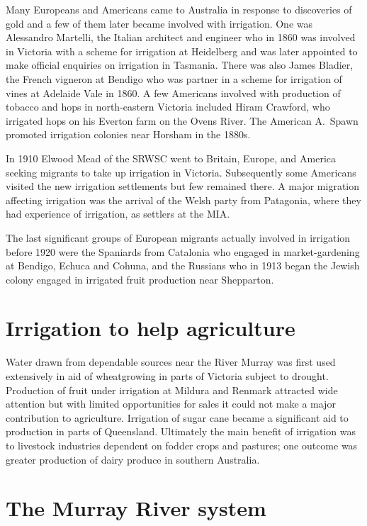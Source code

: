 Many Europeans and Americans came to Australia in response to
discoveries of gold and a few of them later became involved with
irrigation.  One was Alessandro Martelli, the Italian architect and
engineer who in 1860 was involved in Victoria with a scheme for
irrigation at Heidelberg and was later appointed to make official
enquiries on irrigation in Tasmania.  There was also James Bladier,
the French vigneron at Bendigo who was partner in a scheme for
irrigation of vines at Adelaide Vale in 1860.  A few Americans
involved with production of tobacco and hops in north-eastern Victoria
included Hiram Crawford, who irrigated hops on his Everton farm on the
Ovens River.  The American A.~Spawn promoted irrigation colonies near
Horsham in the 1880s.

In 1910 Elwood Mead of the SRWSC went to Britain, Europe, and America
seeking migrants to take up irrigation in Victoria.  Subsequently some
Americans visited the new irrigation settlements but few remained
there.  A major migration affecting irrigation was the arrival of the
Welsh party from Patagonia, where they had experience of irrigation,
as settlers at the MIA.

The last significant groups of European migrants actually involved in
irrigation before 1920 were the Spaniards from Catalonia who engaged
in market-gardening at Bendigo, Echuca and Cohuna, and the Russians
who in 1913 began the Jewish colony engaged in irrigated fruit
production near Shepparton.

\section{Irrigation to help agriculture}

Water drawn from dependable sources near the River Murray was first
used extensively in aid of wheatgrowing in parts of Victoria subject
to drought.  Production of fruit under irrigation at Mildura and
Renmark attracted wide attention but with limited opportunities for
sales it could not make a major contribution to agriculture.
Irrigation of sugar cane became a significant aid to production in
parts of Queensland.  Ultimately the main benefit of irrigation was to
livestock industries dependent on fodder crops and pastures; one
outcome was greater production of dairy produce in southern Australia.

\section{The Murray River system}

